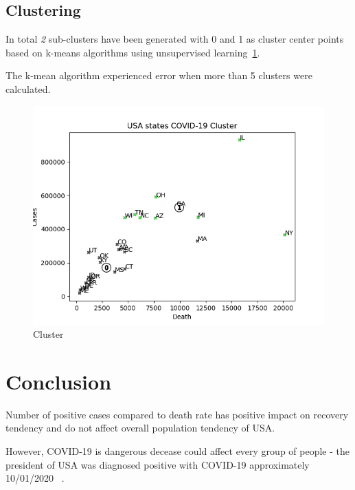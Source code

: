 \subsection{Clustering}
\label{subsec:clustering}

In total \textit{2} sub-clusters have been generated with 0 and 1 as cluster center points based on k-means algorithms using unsupervised learning~\ref{fig:states_cluster}.

The k-mean algorithm experienced error when more than 5 clusters were calculated.


\begin{figure}[h]
    \includegraphics*[width=\linewidth, keepaspectratio]{../src/output/cluster.png}
    \caption{Cluster}
    \label{fig:states_cluster}
\end{figure}



\section{Conclusion}
\label{sec:conclusion}

Number of positive cases compared to death rate has positive impact on recovery tendency and do not affect overall population tendency of USA\@.

However, COVID-19 is dangerous decease could affect every group of people - the president of USA was diagnosed positive with COVID-19  approximately 10/01/2020 ~\cite{twitter-1311892190680014849}.

